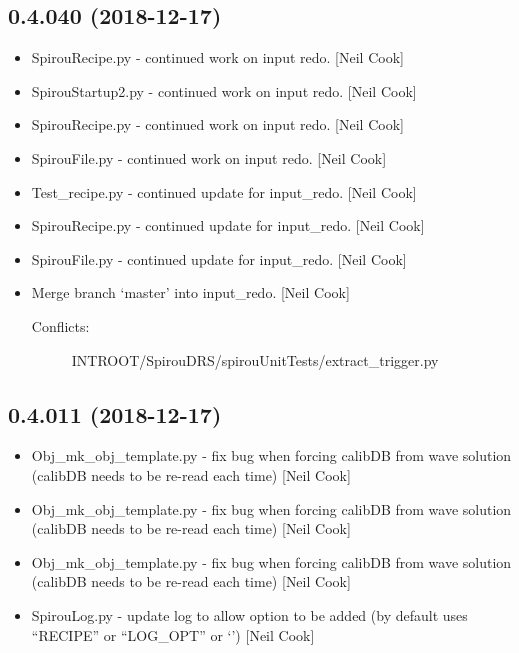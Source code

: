\documentclass[a4paper,10pt,english]{report}
\begin{document}
\subsection{0.4.040 (2018-12-17)}
\label{\detokenize{misc/changelog:id227}}\begin{itemize}
\item {} 
SpirouRecipe.py - continued work on input redo. {[}Neil Cook{]}

\item {} 
SpirouStartup2.py - continued work on input redo. {[}Neil Cook{]}

\item {} 
SpirouRecipe.py - continued work on input redo. {[}Neil Cook{]}

\item {} 
SpirouFile.py - continued work on input redo. {[}Neil Cook{]}

\item {} 
Test\_recipe.py - continued update for input\_redo. {[}Neil Cook{]}

\item {} 
SpirouRecipe.py - continued update for input\_redo. {[}Neil Cook{]}

\item {} 
SpirouFile.py - continued update for input\_redo. {[}Neil Cook{]}

\item {} 
Merge branch ‘master’ into input\_redo. {[}Neil Cook{]}
\begin{description}
\item[{Conflicts:}] \leavevmode
INTROOT/SpirouDRS/spirouUnitTests/extract\_trigger.py

\end{description}

\end{itemize}


\subsection{0.4.011 (2018-12-17)}
\label{\detokenize{misc/changelog:id228}}\begin{itemize}
\item {} 
Obj\_mk\_obj\_template.py - fix bug when forcing calibDB from wave
solution (calibDB needs to be re-read each time) {[}Neil Cook{]}

\item {} 
Obj\_mk\_obj\_template.py - fix bug when forcing calibDB from wave
solution (calibDB needs to be re-read each time) {[}Neil Cook{]}

\item {} 
Obj\_mk\_obj\_template.py - fix bug when forcing calibDB from wave
solution (calibDB needs to be re-read each time) {[}Neil Cook{]}

\item {} 
SpirouLog.py - update log to allow option to be added (by default uses
“RECIPE” or “LOG\_OPT” or ‘’) {[}Neil Cook{]}

\end{itemize}
\end{document}
